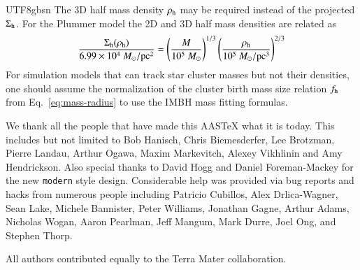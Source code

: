 \documentclass[trackchanges, twocolappendix, twocolumn]{aastex701}
\begin{document}
\begin{CJK*}{UTF8}{gbsn}
The 3D half mass density $\rho_{\rm h}$ may be required instead of the projected $\Sigma_{\rm h}$. For the Plummer model the 2D and 3D half mass densities are related as
\begin{align}
\dfrac{\Sigma_{\rm h} (\rho_{\rm h})}{6.99\times10^4~M_\odot/{\rm pc}^2} = \left( \dfrac{M}{10^5~M_\odot} \right)^{1/3} \left( \dfrac{\rho_{\rm h}}{10^5~M_\odot/{\rm pc}^3} \right)^\mathrm{2/3}
\label{eq:Sigma_h}
\end{align}
For simulation models that can track star cluster masses but not their densities, one should assume the normalization of the cluster birth mass size relation $f_{\rm h}$ from Eq.~\ref{eq:mass-radius} to use the IMBH mass fitting formulas.

\begin{acknowledgments}
We thank all the people that have made this AASTeX what it is today.  This
includes but not limited to Bob Hanisch, Chris Biemesderfer, Lee Brotzman,
Pierre Landau, Arthur Ogawa, Maxim Markevitch, Alexey Vikhlinin and Amy
Hendrickson. Also special thanks to David Hogg and Daniel Foreman-Mackey
for the new {\tt\string modern} style design. Considerable help was provided via bug
reports and hacks from numerous people including Patricio Cubillos, Alex
Drlica-Wagner, Sean Lake, Michele Bannister, Peter Williams, Jonathan
Gagne, Arthur Adams, Nicholas Wogan, Aaron Pearlman, Jeff Mangum, Mark Durre, Joel Ong, and Stephen Thorp.
\end{acknowledgments}

\begin{contribution}

All authors contributed equally to the Terra Mater collaboration.



\end{contribution}
\end{CJK*}
\end{document}
